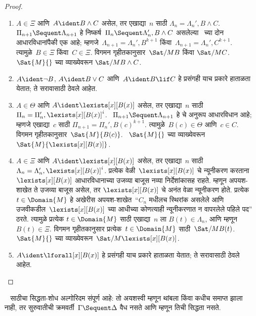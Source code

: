\begin{proof}
\begin{enumerate}
  \item $A \in \Xi$ आणि~$A \ident B \land C$
  असेल, तर एखाद्या~$n$ साठी
  $\Lambda_n = \Lambda_n', B \land C$.
  ~$\Pi_{n+1} \Sequent \Lambda_{n+1}$ हे
  निष्कर्ष~$\Pi_n \Sequent \Lambda'_n, B \land C$
  असलेल्या~\RightR{\land} च्या दोन आधारविधानांपैकी
  एक आहे; म्हणजे~$\Lambda_{n+1} = \Lambda_n', B^{k+1}$
  किंवा~$\Lambda_{n+1} = \Lambda_n', C^{k+1}$.
  त्यामुळे~$B \in \Xi$ किंवा~$C \in \Xi$.
  विगमन गृहीतकानुसार~$\Sat/{M}{B}$ किंवा
  $\Sat/{M}{C}$. ~$\Sat{M}{}$ च्या व्याख्येवरून
  $\Sat/{M}{B \land C}$.

  \item $A \ident \lnot B$,
  $A \ident B \lor C$ आणि~$A \ident B \lif C$
  हे प्रसंगही याच प्रकारे हाताळता येतात;
  ते सरावासाठी ठेवले आहेत.

  \item $A \in \Theta$ आणि
  $A \ident \lexists[x][B(x)]$ असेल,
  तर एखाद्या~$n$ साठी
  $\Pi_n = \Pi_n', \lexists[x][B(x)]^i$.
  ~$\Pi_{n+1} \Sequent \Lambda_{n+1}$ हे
  \LeftR{\lexists} चे अनुरूप आधारविधान आहे;
  म्हणजे एखाद्या~$c$ साठी
  $\Pi_{n+1} = \Pi_n', B(c)^{k+1}$.
  त्यामुळे~$B(c) \in \Theta$ आणि~$c \in C$.
  विगमन गृहीतकानुसार~$\Sat{M}{B(c)}$.
  ~$\Sat{M}{}$ च्या व्याख्येवरून
  $\Sat{M}{\lexists[x][B(x)]}$.

  \item $A \in \Xi$ आणि
  $A \ident \lexists[x][B(x)]$ असेल,
  तर एखाद्या~$n$ साठी
  $\Lambda_n = \Lambda_n', \lexists[x][B(x)]^i$.
  प्रत्येक वेळी~$\lexists[x][B(x)]$ चे
  न्यूनीकरण करताना~$\lexists[x][B(x)]$
  आधारविधानाच्या उजव्या
  बाजूस नव्या निर्देशांकासह राहते. म्हणून
  अपयश-शाखेत ते उजव्या बाजूस असेल, तर
  $\lexists[x][B(x)]$ चे अनंत वेळा
  न्यूनीकरण होते. प्रत्येक~$t \in \Domain{M}$
  हे अखेरीस अपयश-शाखेत~``$C_n$ मधीलच स्थिरांक
  असलेले आणि उजवीकडील~$\lexists[x][B(x)]$
  च्या आधीच्या कोणत्याही न्यूनीकरणात न वापरलेले
  पहिले पद'' ठरते. त्यामुळे प्रत्येक
  $t \in \Domain{M}$ साठी एखाद्या~$n$ ला
  $B(t) \in \Lambda_n$, आणि म्हणून~$B(t) \in \Xi$.
  विगमन गृहीतकानुसार प्रत्येक~$t \in \Domain{M}$
  साठी~$\Sat/{M}{B(t)}$. ~$\Sat{M}{}$
  च्या व्याख्येवरून~$\Sat/{M}{\lexists[x][B(x)]}$.

  \item $A \ident \lforall[x][B(x)]$
  हे प्रसंगही याच प्रकारे हाताळता येतात;
  ते सरावासाठी ठेवले आहेत.
\end{enumerate}
\end{proof}

\begin{cor}\label{pt:ps:cpl:cor:complete}
~ साठीचा सिद्धता-शोध अल्गोरिदम संपूर्ण
आहे: तो अयशस्वी म्हणून थांबला किंवा कधीच समाप्त झाला नाही,
तर सुरुवातीची क्रमवर्ती~$\Gamma \Sequent \Delta$
वैध नसते आणि म्हणून तिची सिद्धता नसते.
\end{cor}

